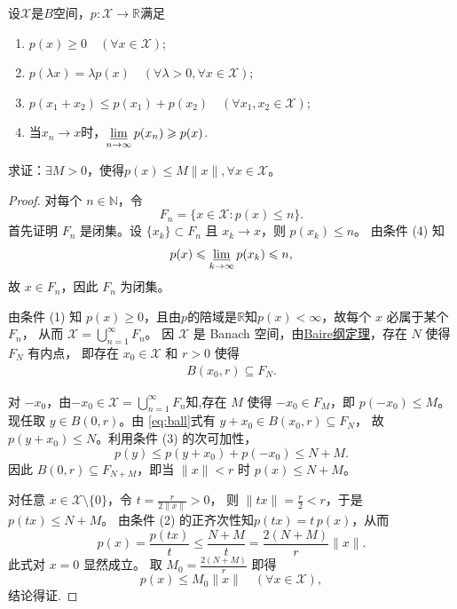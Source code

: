 \documentclass[../../main.tex]{subfiles}%
\begin{document}
\begin{lemma}[Gelfand引理]\label{lemma:泛函分析--Gelfand引理}
设$\mathscr{X}$是$B$空间，$p:\mathscr{X}\to\mathbb{R}$满足
\begin{enumerate}[(1)]
\item $p(x)\geqslant 0\quad (\forall x\in\mathscr{X})$;
\item $p(\lambda x)=\lambda p(x)\quad (\forall\lambda>0,\forall x\in\mathscr{X})$;
\item $p(x_1+x_2)\leqslant p(x_1)+p(x_2)\quad (\forall x_1,x_2\in\mathscr{X})$;
\item 当$x_n\to x$时，$\varliminf\limits_{n\to\infty}p(x_n)\geqslant p(x)$.
\end{enumerate}
求证：$\exists M>0$，使得$p(x)\leqslant M\|x\|,\forall x\in\mathscr{X}$。
\end{lemma}
\begin{proof}

对每个 $n\in\mathbb{N}$，令
\[
F_n = \{x\in\mathscr{X} : p(x) \leqslant n\}.
\]
首先证明 $F_n$ 是闭集。设 $\{x_k\}\subset F_n$ 且 $x_k\to x$，则 $p(x_k)\leqslant n$。
由条件 (4) 知
\[
p(x) \leqslant \varliminf_{k\to\infty} p(x_k) \leqslant n,
\]
故 $x\in F_n$，因此 $F_n$ 为闭集。

由条件 (1) 知 $p(x)\geqslant 0$，且由$p$的陪域是$\mathbb{R}$知$p(x)<\infty$，故每个 $x$ 必属于某个 $F_n$，
从而 $\mathscr{X} = \bigcup_{n=1}^\infty F_n$。
因 $\mathscr{X}$ 是 Banach 空间，由\hyperref[theorem:泛函分析--Baire纲定理]{Baire纲定理}，存在 $N$ 使得 $F_N$ 有内点，
即存在 $x_0\in\mathscr{X}$ 和 $r>0$ 使得
\begin{align}\label{eq:ball}
B(x_0, r) \subseteq F_N.
\end{align}

对 $-x_0$，由$-x_0\in \mathscr{X} = \bigcup_{n=1}^\infty F_n$知,存在 $M$ 使得 $-x_0\in F_M$，即 $p(-x_0)\leqslant M$。
现任取 $y\in B(0,r)$。由 \eqref{eq:ball}式有 $y+x_0\in B(x_0,r)\subseteq F_N$，
故 $p(y+x_0)\leqslant N$。利用条件 (3) 的次可加性，
\[
p(y) \leqslant p(y+x_0) + p(-x_0) \leqslant N + M.
\]
因此 $B(0,r) \subseteq F_{N+M}$，即当 $\|x\|<r$ 时 $p(x)\leqslant N+M$。

对任意 $x\in\mathscr{X}\setminus\{0\}$，令 $t = \frac{r}{2\|x\|}>0$，
则 $\|tx\| = \frac{r}{2} < r$，于是 $p(tx) \leqslant N+M$。
由条件 (2) 的正齐次性知$p(tx)=t\,p(x)$，从而
\[
p(x) =\frac{p(tx)}{t}\leqslant \frac{N+M}{t} = \frac{2(N+M)}{r}\|x\|.
\]
此式对 $x=0$ 显然成立。
取 $M_0 = \frac{2(N+M)}{r}$ 即得
\[
p(x) \leqslant M_0 \|x\| \quad (\forall x\in\mathscr{X}),
\]
结论得证.
\end{proof}
\end{document}
